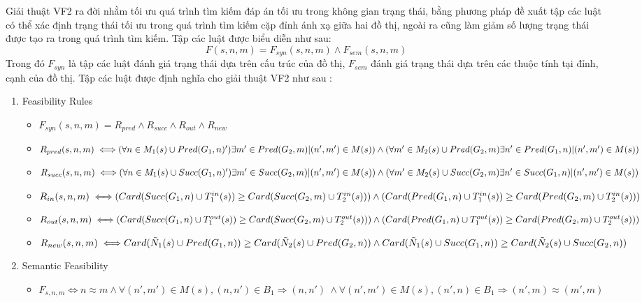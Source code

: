 \documentclass[12pt]{report}
\begin{document}
\noindent Giải thuật VF2 ra đời nhằm tối ưu quá trình tìm kiếm đáp án tối ưu trong không gian trạng thái, bằng phương pháp đề xuất tập các luật có thể xác định trạng thái tối ưu trong quá trình tìm kiếm cặp đỉnh ánh xạ giữa hai đồ thị, ngoài ra cũng làm giảm số lượng trạng thái được tạo ra trong quá trình tìm kiếm. Tập các luật được biểu diễn như sau:
\indent \indent \indent \indent \indent
\begin{equation}
	F(s,n,m) = F_{syn}(s,n,m) \wedge F_{sem}(s,n,m)
\end{equation}
Trong đó $F_{syn}$ là tập các luật đánh giá trạng thái dựa trên cấu trúc của đồ thị, $F_{sem}$ đánh giá trạng thái dựa trên các thuộc tính tại đỉnh, cạnh của đồ thị.
\noindent Tập các luật được định nghĩa cho giải thuật VF2 như sau \cite{vf2_1368}:
\begin{enumerate}
	\item Feasibility Rules 
	\begin{itemize}
		\item $F_{syn}(s,n,m) = R_{pred} \wedge R_{succ} \wedge R_{out} \wedge R_{new}$
		\item $R_{pred}(s,n,m) \iff\\ (\forall n \in M_1(s) \cup Pred(G_1,n)') \exists m' \in Pred(G_2,m) | (n',m') \in M(s)) \wedge\\
		(\forall m' \in M_2(s) \cup Pred(G_2,m) \exists n' \in Pred(G_1,n) | (n',m') \in M(s))$
		\item $R_{succ}(s,n,m) \iff\\ (\forall n \in M_1(s) \cup Succ(G_1,n)') \exists m' \in Succ(G_2,m) | (n',m') \in M(s)) \wedge\\ 
		(\forall m' \in M_2(s) \cup Succ(G_2,m) \exists n' \in Succ(G_1,n) | (n',m') \in M(s))$
		\item $R_{in}(s,n,m) \iff\\ (Card(Succ(G_1,n) \cup T^{in}_1(s)) \geq  Card(Succ(G_2,m) \cup T^{in}_2(s))) \wedge\\
		(Card(Pred(G_1,n)\cup T^{in}_1(s)) \geq Card(Pred(G_2,m)\cup T^{in}_2(s)))$ 
		\item $R_{out}(s,n,m) \iff\\ (Card(Succ(G_1,n) \cup T^{out}_1(s)) \geq  Card(Succ(G_2,m) \cup T^{out}_2(s))) \wedge\\
		(Card(Pred(G_1,n)\cup T^{out}_1(s)) \geq Card(Pred(G_2,m)\cup T^{out}_2(s)))$ 
		\item $R_{new}(s,n,m) \iff\\ Card(\tilde{N}_1(s) \cup Pred(G_1,n)) \geq Card(\tilde{N}_2(s) \cup Pred(G_2,n)) \wedge\\
		Card(\tilde{N}_1(s) \cup Succ(G_1,n)) \geq Card(\tilde{N}_2(s) \cup Succ(G_2,n))$
	\end{itemize}
	\item Semantic Feasibility
	\begin{itemize}
		\item $F_{s,n,m} \iff n \approx m  \wedge \forall(n',m') \in M(s),(n,n') \in B_1 \Rightarrow (n,n')\
		 \wedge \forall(n',m') \in M(s),(n',n) \in B_1 \Rightarrow (n',m) \approx (m',m)$
	\end{itemize} 
\end{enumerate}
\end{document}
